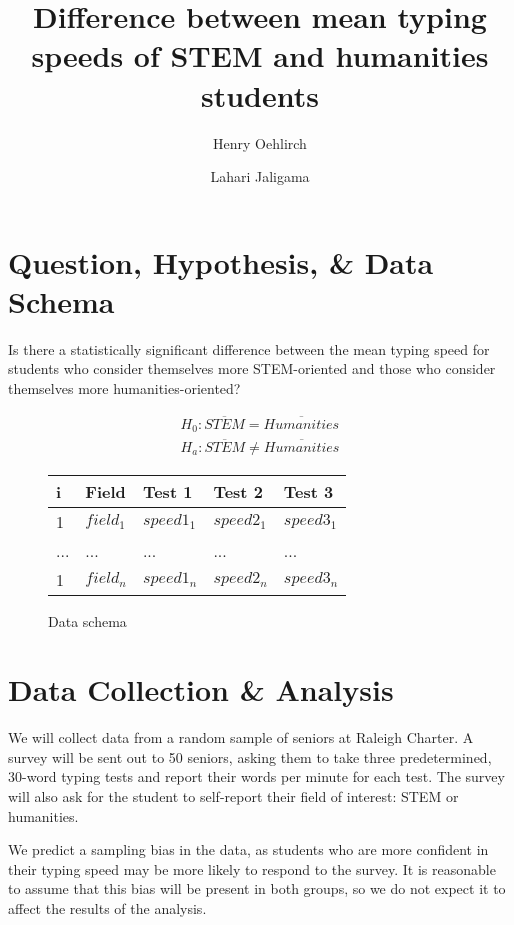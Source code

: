 \documentclass{article}
\author{Henry Oehlirch \and Lahari Jaligama}
\title{Difference between mean typing speeds of STEM and humanities students}
\begin{document}
\maketitle{}

\section{Question, Hypothesis, \& Data Schema}

Is there a statistically significant difference between the mean typing speed
for students who consider themselves more STEM-oriented and those who consider
themselves more humanities-oriented?

\begin{gather}
    H_0: \overline{STEM} = \overline{Humanities} \\
    H_a: \overline{STEM} \neq \overline{Humanities}
\end{gather} 

\begin{figure}[h]
    \centering
    \begin{tabular}{lllll}
        \toprule
        i & Field & Test 1 & Test 2 & Test 3 \\
        \midrule
        1 & $field_1$ & $speed1_1$ & $speed2_1$ & $speed3_1$ \\
        ... & ... & ... & ... & ... \\
        1 & $field_n$ & $speed1_n$ & $speed2_n$ & $speed3_n$ \\
    \end{tabular}
    \caption{Data schema}
\end{figure}

\section{Data Collection \& Analysis}

We will collect data from a random sample of seniors at Raleigh Charter. A
survey will be sent out to 50 seniors, asking them to take three predetermined,
30-word typing tests and report their words per minute for each test. The
survey will also ask for the student to self-report their field of interest:
STEM or humanities.

We predict a sampling bias in the data, as students who are more confident in
their typing speed may be more likely to respond to the survey. It is
reasonable to assume that this bias will be present in both groups, so we do
not expect it to affect the results of the analysis.
\end{document}
